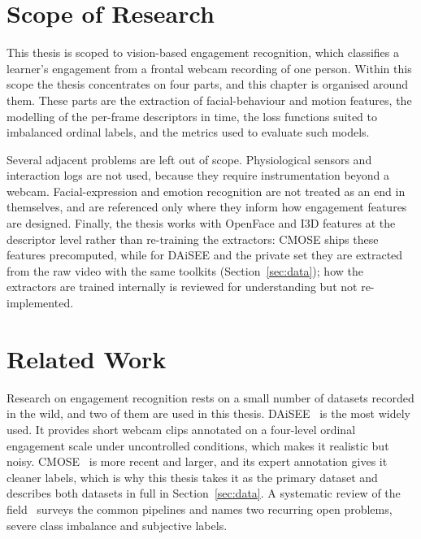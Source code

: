 \documentclass[../main.tex]{subfiles}
\begin{document}
\FloatBarrier
\section{Scope of Research}
\label{sec:scope}

This thesis is scoped to vision-based engagement recognition, which classifies a learner's engagement from a frontal webcam recording of one person. Within this scope the thesis concentrates on four parts, and this chapter is organised around them. These parts are the extraction of facial-behaviour and motion features, the modelling of the per-frame descriptors in time, the loss functions suited to imbalanced ordinal labels, and the metrics used to evaluate such models.

Several adjacent problems are left out of scope. Physiological sensors and interaction logs are not used, because they require instrumentation beyond a webcam. Facial-expression and emotion recognition are not treated as an end in themselves, and are referenced only where they inform how engagement features are designed. Finally, the thesis works with OpenFace and I3D features at the descriptor level rather than re-training the extractors: CMOSE ships these features precomputed, while for DAiSEE and the private set they are extracted from the raw video with the same toolkits (Section~\ref{sec:data}); how the extractors are trained internally is reviewed for understanding but not re-implemented.

\FloatBarrier
\section{Related Work}
\label{sec:related}

Research on engagement recognition rests on a small number of datasets recorded in the wild, and two of them are used in this thesis. DAiSEE~\cite{daisee} is the most widely used. It provides short webcam clips annotated on a four-level ordinal engagement scale under uncontrolled conditions, which makes it realistic but noisy. CMOSE~\cite{cmose} is more recent and larger, and its expert annotation gives it cleaner labels, which is why this thesis takes it as the primary dataset and describes both datasets in full in Section~\ref{sec:data}. A systematic review of the field~\cite{review_engagement_cv} surveys the common pipelines and names two recurring open problems, severe class imbalance and subjective labels.
\end{document}
